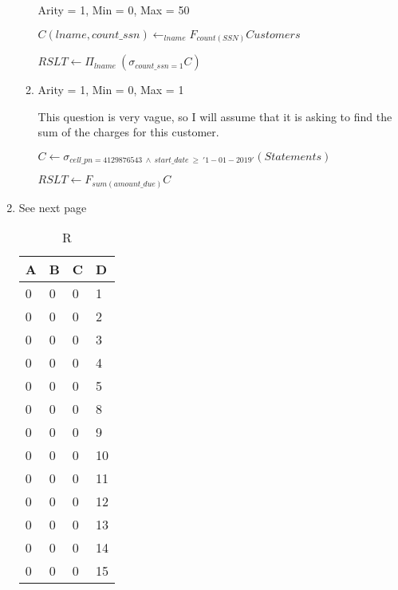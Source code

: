 \documentclass[12pt]{article}
\begin{document}
\begin{enumerate}
\begin{enumerate}
Arity = 1, Min = 0, Max = 50

$ C(lname, count\_ssn) \leftarrow _{lname} F_{count(SSN)} Customers $

$ RSLT \leftarrow \Pi_{lname} \ (\sigma_{count\_ssn = 1} C ) $

\item %
Arity = 1, Min = 0, Max = 1

This question is very vague, so I will assume that it is asking to find
the sum of the charges for this customer.

$ C \leftarrow \sigma_{cell\_pn = 4129876543 \ \land \ start\_date \ \geq \  '1-01-2019'} (Statements) $

$ RSLT \leftarrow F_{sum(amount\_due)} C $


\end{enumerate}

\item %

See next page


\begin{table}[]
	\caption{R}
	\centering
	\begin{tabular}{|l|l|l|l|}
	\hline
	\textbf{A} & \textbf{B} & \textbf{C} & \textbf{D} \\ \hline
	0          & 0          & 0          & 1          \\ \hline
	0          & 0          & 0          & 2          \\ \hline
	0          & 0          & 0          & 3          \\ \hline
	0          & 0          & 0          & 4          \\ \hline
	0          & 0          & 0          & 5          \\ \hline
	0          & 0          & 0          & 8          \\ \hline
	0          & 0          & 0          & 9          \\ \hline
	0          & 0          & 0          & 10         \\ \hline
	0          & 0          & 0          & 11         \\ \hline
	0          & 0          & 0          & 12         \\ \hline
	0          & 0          & 0          & 13         \\ \hline
	0          & 0          & 0          & 14         \\ \hline
	0          & 0          & 0          & 15         \\ \hline
	\end{tabular}
	\end{table}




\end{enumerate}
\end{document}
